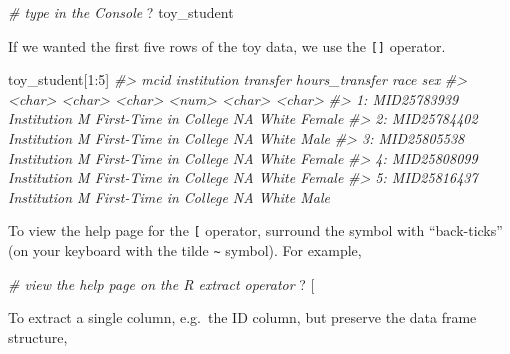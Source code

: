 \documentclass[
]{book}
\newenvironment{Shaded}{\begin{snugshade}}{\end{snugshade}}
\newcommand{\AttributeTok}[1]{\textcolor[rgb]{0.77,0.63,0.00}{#1}}
\newcommand{\CommentTok}[1]{\textcolor[rgb]{0.56,0.35,0.01}{\textit{#1}}}
\newcommand{\DecValTok}[1]{\textcolor[rgb]{0.00,0.00,0.81}{#1}}
\newcommand{\NormalTok}[1]{#1}
\newcommand{\SpecialCharTok}[1]{\textcolor[rgb]{0.00,0.00,0.00}{#1}}
\newcommand{\StringTok}[1]{\textcolor[rgb]{0.31,0.60,0.02}{#1}}
\begin{document}
\begin{Shaded}
\begin{Highlighting}[]
\CommentTok{\# type in the Console}
\NormalTok{? toy\_student}
\end{Highlighting}
\end{Shaded}

If we wanted the first five rows of the toy data, we use the \texttt{{[}{]}} operator.

\begin{Shaded}
\begin{Highlighting}[]
\NormalTok{toy\_student[}\DecValTok{1}\SpecialCharTok{:}\DecValTok{5}\NormalTok{]}
\CommentTok{\#\textgreater{}           mcid   institution              transfer hours\_transfer   race    sex}
\CommentTok{\#\textgreater{}         \textless{}char\textgreater{}        \textless{}char\textgreater{}                \textless{}char\textgreater{}          \textless{}num\textgreater{} \textless{}char\textgreater{} \textless{}char\textgreater{}}
\CommentTok{\#\textgreater{} 1: MID25783939 Institution M First{-}Time in College             NA  White Female}
\CommentTok{\#\textgreater{} 2: MID25784402 Institution M First{-}Time in College             NA  White   Male}
\CommentTok{\#\textgreater{} 3: MID25805538 Institution M First{-}Time in College             NA  White Female}
\CommentTok{\#\textgreater{} 4: MID25808099 Institution M First{-}Time in College             NA  White Female}
\CommentTok{\#\textgreater{} 5: MID25816437 Institution M First{-}Time in College             NA  White   Male}
\end{Highlighting}
\end{Shaded}

To view the help page for the \texttt{{[}} operator, surround the symbol with ``back-ticks'' (on your keyboard with the tilde \texttt{\textasciitilde{}} symbol). For example,

\begin{Shaded}
\begin{Highlighting}[]
\CommentTok{\# view the help page on the R extract operator}
\NormalTok{? }\StringTok{\textasciigrave{}}\AttributeTok{[}\StringTok{\textasciigrave{}}
\end{Highlighting}
\end{Shaded}

To extract a single column, e.g.~the ID column, but preserve the data frame structure,
\end{document}
